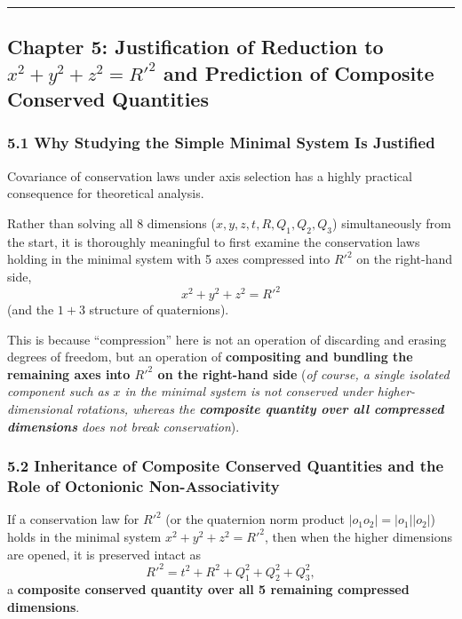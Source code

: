 \documentclass[
  a4paper,
]{article}
\begin{document}
\begin{center}\rule{0.5\linewidth}{0.5pt}\end{center}

\subsection{\texorpdfstring{Chapter 5: Justification of Reduction to
\(x^2 + y^2 + z^2 = R'^2\) and Prediction of Composite Conserved
Quantities}{Chapter 5: Justification of Reduction to x\^{}2 + y\^{}2 + z\^{}2 = R\textquotesingle\^{}2 and Prediction of Composite Conserved Quantities}}\label{chapter-5-justification-of-reduction-to-x2-y2-z2-r2-and-prediction-of-composite-conserved-quantities}

\subsubsection{5.1 Why Studying the Simple Minimal System Is
Justified}\label{why-studying-the-simple-minimal-system-is-justified}

Covariance of conservation laws under axis selection has a highly
practical consequence for theoretical analysis.

Rather than solving all 8 dimensions (\(x, y, z, t, R, Q_1, Q_2, Q_3\))
simultaneously from the start, it is thoroughly meaningful to first
examine the conservation laws holding in the minimal system with 5 axes
compressed into \(R'^2\) on the right-hand side,
\[x^2 + y^2 + z^2 = R'^2\] (and the \(1 + 3\) structure of quaternions).

This is because ``compression'' here is not an operation of discarding
and erasing degrees of freedom, but an operation of \textbf{compositing
and bundling the remaining axes into \(R'^2\) on the right-hand side}
(\emph{of course, a single isolated component such as \(x\) in the
minimal system is not conserved under higher-dimensional rotations,
whereas the \textbf{composite quantity over all compressed dimensions}
does not break conservation}).

\subsubsection{5.2 Inheritance of Composite Conserved Quantities and the
Role of Octonionic
Non-Associativity}\label{inheritance-of-composite-conserved-quantities-and-the-role-of-octonionic-non-associativity}

If a conservation law for \(R'^2\) (or the quaternion norm product
\(|o_1 o_2| = |o_1||o_2|\)) holds in the minimal system
\(x^2 + y^2 + z^2 = R'^2\), then when the higher dimensions are opened,
it is preserved intact as \[R'^2 = t^2 + R^2 + Q_1^2 + Q_2^2 + Q_3^2,\]
a \textbf{composite conserved quantity over all 5 remaining compressed
dimensions}.
\end{document}
